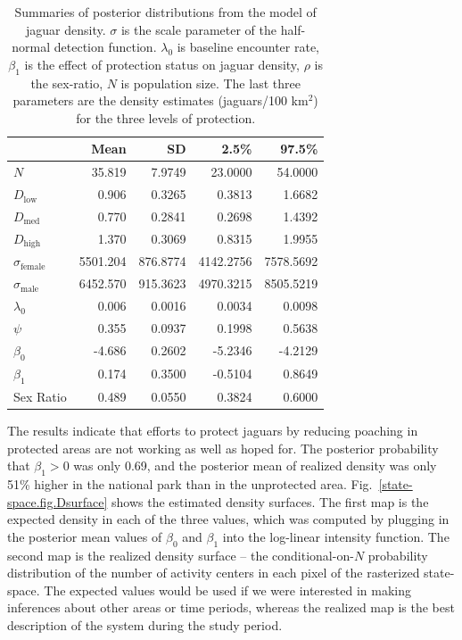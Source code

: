 \begin{table}
\centering
\caption{Summaries of posterior distributions from the model of jaguar
  density. $\sigma$ is the scale parameter of
  the half-normal detection function. $\lambda_0$ is baseline
  encounter rate,
$\beta_1$ is the
  effect of protection status on jaguar density, $\rho$ is the
  sex-ratio,  $N$ is population size. The last three parameters are the density estimates
  (jaguars/100 km$^2$) for the three levels of protection.}
\begin{tabular}{lrrrr}
\hline
& Mean & SD & 2.5\% & 97.5\% \\
\hline
 $N$ 	&   35.819 	&   7.9749 	&   23.0000 	&   54.0000 \\
 $D_\text{low}$ 	&    0.906 	&   0.3265 	&    0.3813 	&    1.6682 \\
 $D_\text{med}$ 	&    0.770 	&   0.2841 	&    0.2698 	&    1.4392 \\
 $D_\text{high}$ 	&    1.370 	&   0.3069 	&    0.8315 	&    1.9955 \\
 $\sigma_\text{female}$ 	& 5501.204 	& 876.8774 	& 4142.2756 	& 7578.5692 \\
 $\sigma_\text{male}$ 	& 6452.570 	& 915.3623 	& 4970.3215 	& 8505.5219 \\
 $\lambda_0$ 	&    0.006 	&   0.0016 	&    0.0034 	&    0.0098 \\
 $\psi$ 	&    0.355 	&   0.0937 	&    0.1998 	&    0.5638 \\
 $\beta_0$ 	&   -4.686 	&   0.2602 	&   -5.2346 	&   -4.2129 \\
 $\beta_1$ 	&    0.174 	&   0.3500 	&   -0.5104 	&    0.8649 \\
 Sex Ratio 	&    0.489 	&   0.0550 	&    0.3824 	&    0.6000 \\
 \hline
\end{tabular}
\label{state-space.tab.jagposts}
\end{table}

The results indicate that efforts to protect jaguars by reducing
poaching in protected areas are not working as well as hoped for. The
posterior probability that $\beta_1 > 0$ was only 0.69, and
the posterior mean of realized density was only 51\% higher in the national park than in the
unprotected area. Fig.~\ref{state-space.fig.Dsurface} shows the estimated
density surfaces. The first map is the expected density in each of
the three values, which was computed by plugging in the posterior mean
values of $\beta_0$ and $\beta_1$ into the log-linear intensity
function. The second map is the realized density surface -- the
conditional-on-$N$ probability distribution of the number of
activity centers in each pixel of the rasterized
state-space. The expected values
would be used if we were interested in making inferences about other
areas or time periods, whereas the realized map is the best
description of the system during the study period.

